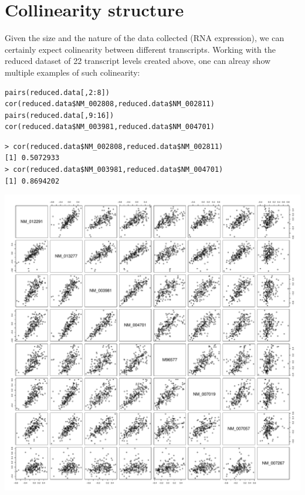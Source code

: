 \documentclass[11pt, a4paper]{article}
\begin{document}
\section{Collinearity structure}
\label{sec-3}

Given the size and the nature of the data collected (RNA expression),
we can certainly expect colinearity between different
transcripts. Working with the reduced dataset of 22 transcript levels
created above, one can alreay show multiple examples of such
colinearity:


\begin{verbatim}
pairs(reduced.data[,2:8])
cor(reduced.data$NM_002808,reduced.data$NM_002811)
pairs(reduced.data[,9:16])
cor(reduced.data$NM_003981,reduced.data$NM_004701)
\end{verbatim}


\begin{verbatim}
> cor(reduced.data$NM_002808,reduced.data$NM_002811)
[1] 0.5072933
> cor(reduced.data$NM_003981,reduced.data$NM_004701)
[1] 0.8694202
\end{verbatim}


\includegraphics[scale=0.4]{pairs-colinearity.pdf}
\end{document}
